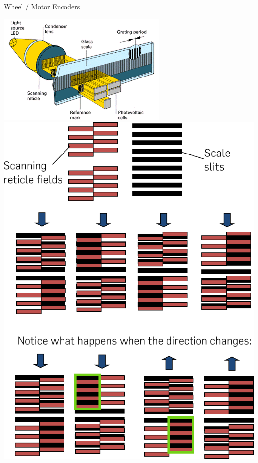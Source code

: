 \documentclass[compress]{beamer}
\begin{document}
\begin{frame}{Wheel / Motor Encoders}
    \centering

        \includegraphics[width=0.45\columnwidth]{encoders2}
        \includegraphics[width=0.45\columnwidth]{encoders}



\end{frame}
\end{document}

